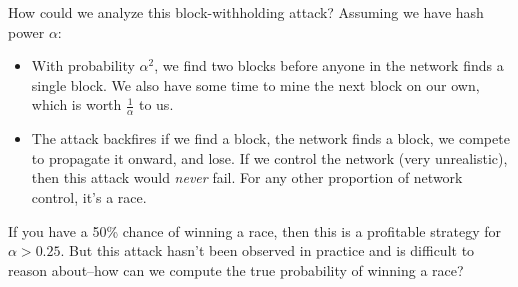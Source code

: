 \documentclass[12pt]{article}
\begin{document}
How could we analyze this block-withholding attack? Assuming we have hash power $\alpha$:
\begin{itemize}
\item With probability $\alpha^2$, we find two blocks before anyone in the network finds a single block. We also have some time to mine the next block on our own, which is worth $\frac{1}{\alpha}$ to us.
\item The attack backfires if we find a block, the network finds a block, we compete to propagate it onward, and lose. If we control the network (very unrealistic), then this attack would \textit{never} fail. For any other proportion of network control, it's a race.
\end{itemize}

If you have a 50\% chance of winning a race, then this is a profitable strategy for $\alpha > 0.25$. But this attack hasn't been observed in practice and is difficult to reason about--how can we compute the true probability of winning a race?
\end{document}
